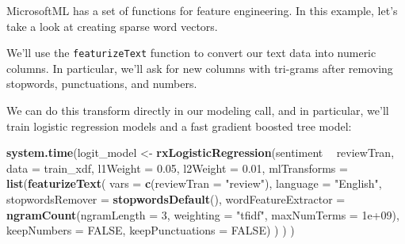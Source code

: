 \documentclass[]{book}
\newenvironment{Shaded}{\begin{snugshade}}{\end{snugshade}}
\newcommand{\KeywordTok}[1]{\textcolor[rgb]{0.13,0.29,0.53}{\textbf{#1}}}
\newcommand{\DataTypeTok}[1]{\textcolor[rgb]{0.13,0.29,0.53}{#1}}
\newcommand{\DecValTok}[1]{\textcolor[rgb]{0.00,0.00,0.81}{#1}}
\newcommand{\FloatTok}[1]{\textcolor[rgb]{0.00,0.00,0.81}{#1}}
\newcommand{\StringTok}[1]{\textcolor[rgb]{0.31,0.60,0.02}{#1}}
\newcommand{\OtherTok}[1]{\textcolor[rgb]{0.56,0.35,0.01}{#1}}
\newcommand{\OperatorTok}[1]{\textcolor[rgb]{0.81,0.36,0.00}{\textbf{#1}}}
\newcommand{\NormalTok}[1]{#1}
\theoremstyle{definition}
\theoremstyle{definition}
\theoremstyle{definition}
\theoremstyle{remark}
\begin{document}
MicrosoftML has a set of functions for feature engineering. In this
example, let's take a look at creating sparse word vectors.

We'll use the \texttt{featurizeText} function to convert our text data
into numeric columns. In particular, we'll ask for new columns with
tri-grams after removing stopwords, punctuations, and numbers.

We can do this transform directly in our modeling call, and in
particular, we'll train logistic regression models and a fast gradient
boosted tree model:

\begin{Shaded}
\begin{Highlighting}[]
\KeywordTok{system.time}\NormalTok{(logit_model <-}\StringTok{ }\KeywordTok{rxLogisticRegression}\NormalTok{(sentiment }\OperatorTok{~}\StringTok{ }\NormalTok{reviewTran,}
                                                \DataTypeTok{data =}\NormalTok{ train_xdf,}
                                                \DataTypeTok{l1Weight =} \FloatTok{0.05}\NormalTok{,}
                                                \DataTypeTok{l2Weight =} \FloatTok{0.01}\NormalTok{,}
                                                \DataTypeTok{mlTransforms =} 
                                                  \KeywordTok{list}\NormalTok{(}\KeywordTok{featurizeText}\NormalTok{(}
                                                    \DataTypeTok{vars =} \KeywordTok{c}\NormalTok{(}\DataTypeTok{reviewTran =} \StringTok{"review"}\NormalTok{),}
                                                    \DataTypeTok{language =} \StringTok{"English"}\NormalTok{,}
                                                    \DataTypeTok{stopwordsRemover =} \KeywordTok{stopwordsDefault}\NormalTok{(),}
                                                    \DataTypeTok{wordFeatureExtractor =} 
                                                      \KeywordTok{ngramCount}\NormalTok{(}\DataTypeTok{ngramLength =} \DecValTok{3}\NormalTok{,}
                                                                 \DataTypeTok{weighting =} \StringTok{"tfidf"}\NormalTok{,}
                                                                 \DataTypeTok{maxNumTerms =} \FloatTok{1e+09}\NormalTok{),}
                                                    \DataTypeTok{keepNumbers =} \OtherTok{FALSE}\NormalTok{,}
                                                    \DataTypeTok{keepPunctuations =} \OtherTok{FALSE}\NormalTok{)}
\NormalTok{                                                    )}
\NormalTok{                                                )}
\NormalTok{            )}
\end{Highlighting}
\end{Shaded}
\end{document}
